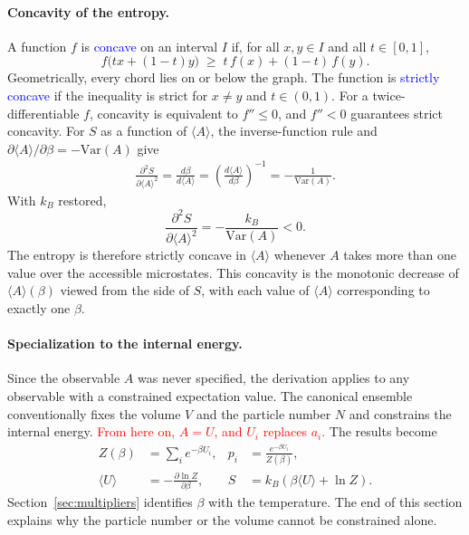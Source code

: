 \paragraph{Concavity of the entropy.}
A function $f$ is \textcolor{blue}{concave} on an interval $I$ if, for all
$x,y\in I$ and all $t\in[0,1]$,
\begin{equation}
    \boxed{f\big(tx+(1-t)y\big)\;\geq\;t\,f(x)+(1-t)\,f(y).}
\end{equation}
Geometrically, every chord lies on or below the graph. The function is
\textcolor{blue}{strictly concave} if the inequality is strict for $x\neq y$
and $t\in(0,1)$. For a twice-differentiable $f$, concavity is equivalent to
$f''\leq0$, and $f''<0$ guarantees strict concavity. For $S$ as a function
of $\langle A\rangle$, the inverse-function rule and
$\partial\langle A\rangle/\partial\beta=-\mathrm{Var}(A)$ give
\begin{align*}
    \frac{\partial^2 S}{\partial\langle A\rangle^2}
    = \frac{d\beta}{d\langle A\rangle}
    = \left(\frac{d\langle A\rangle}{d\beta}\right)^{-1}
    = -\frac{1}{\mathrm{Var}(A)}.
\end{align*}
With $k_B$ restored,
\begin{equation}
    \boxed{\frac{\partial^2 S}{\partial\langle A\rangle^2}
    = -\frac{k_B}{\mathrm{Var}(A)}<0.}
\end{equation}
The entropy is therefore strictly concave in $\langle A\rangle$ whenever $A$
takes more than one value over the accessible microstates. This concavity is
the monotonic decrease of $\langle A\rangle(\beta)$ viewed from the side of
$S$, with each value of $\langle A\rangle$ corresponding to exactly one
$\beta$.

\paragraph{Specialization to the internal energy.}
Since the observable $A$ was never specified, the derivation applies to any
observable with a constrained expectation value. The canonical ensemble
conventionally fixes the volume $V$ and the particle number $N$ and
constrains the internal energy. \textcolor{red}{From here on, $A=U$, and
$U_i$ replaces $a_i$.} The results become
\begin{equation}
    \boxed{
    \begin{aligned}
        Z(\beta) &= \sum_i e^{-\beta U_i}, &
        p_i &= \frac{e^{-\beta U_i}}{Z(\beta)}, \\
        \langle U\rangle &= -\frac{\partial\ln Z}{\partial\beta}, &
        S &= k_B\left(\beta\langle U\rangle+\ln Z\right).
    \end{aligned}}
\end{equation}
Section~\ref{sec:multipliers} identifies $\beta$ with the temperature. The
end of this section explains why the particle number or the volume cannot be
constrained alone.

